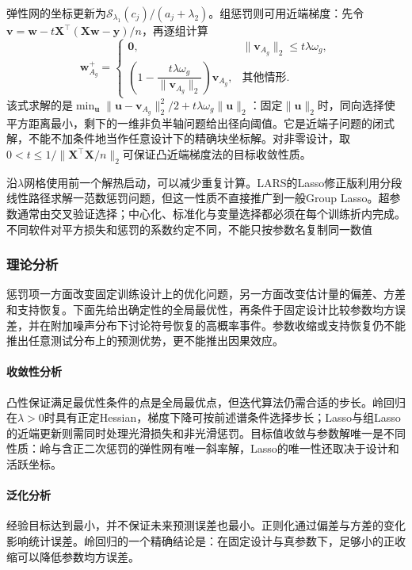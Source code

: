 弹性网的坐标更新为$\mathcal{S}_{\lambda_1}(c_j)/(a_j+\lambda_2)$。组惩罚则可用近端梯度：先令$\bm{v}=\bm{w}-t\bm{X}^{\top}(\bm{X}\bm{w}-\bm{y})/n$，再逐组计算
\begin{equation}
  \bm{w}_{A_g}^{+}
  =
  \begin{cases}
    \bm{0},&\lVert\bm{v}_{A_g}\rVert_2\leq t\lambda\omega_g,\\
    \left(1-\dfrac{t\lambda\omega_g}{\lVert\bm{v}_{A_g}\rVert_2}\right)
      \bm{v}_{A_g},&\text{其他情形}.
  \end{cases}
  \label{eq:regression-group-prox}
\end{equation}
该式求解的是$\min_{\bm{u}}\lVert\bm{u}-\bm{v}_{A_g}\rVert_2^2/2+t\lambda\omega_g\lVert\bm{u}\rVert_2$：固定$\lVert\bm{u}\rVert_2$时，同向选择使平方距离最小，剩下的一维非负半轴问题给出径向阈值。它是近端子问题的闭式解，不能不加条件地当作任意设计下的精确块坐标解。对非零设计，取$0<t\leq1/\lVert\bm{X}^{\top}\bm{X}/n\rVert_2$可保证凸近端梯度法的目标收敛性质。

沿$\lambda$网格使用前一个解热启动，可以减少重复计算。LARS的Lasso修正版利用分段线性路径求解一范数惩罚问题，但这一性质不直接推广到一般Group Lasso。超参数通常由交叉验证选择；中心化、标准化与变量选择都必须在每个训练折内完成。不同软件对平方损失和惩罚的系数约定不同，不能只按参数名复制同一数值

\subsubsection{理论分析}
\label{sec:regression-regularization-theory}

惩罚项一方面改变固定训练设计上的优化问题，另一方面改变估计量的偏差、方差和支持恢复。下面先给出确定性的全局最优性，再条件于固定设计比较参数均方误差，并在附加噪声分布下讨论符号恢复的高概率事件。参数收缩或支持恢复仍不能推出任意测试分布上的预测优势，更不能推出因果效应。

\paragraph{收敛性分析}
凸性保证满足最优性条件的点是全局最优点，但迭代算法仍需合适的步长。岭回归在$\lambda>0$时具有正定Hessian，梯度下降可按前述谱条件选择步长；Lasso与组Lasso的近端更新则需同时处理光滑损失和非光滑惩罚。目标值收敛与参数解唯一是不同性质：岭与含正二次惩罚的弹性网有唯一斜率解，Lasso的唯一性还取决于设计和活跃坐标。

\paragraph{泛化分析}
经验目标达到最小，并不保证未来预测误差也最小。正则化通过偏差与方差的变化影响统计误差。岭回归的一个精确结论是：在固定设计与真参数下，足够小的正收缩可以降低参数均方误差。

